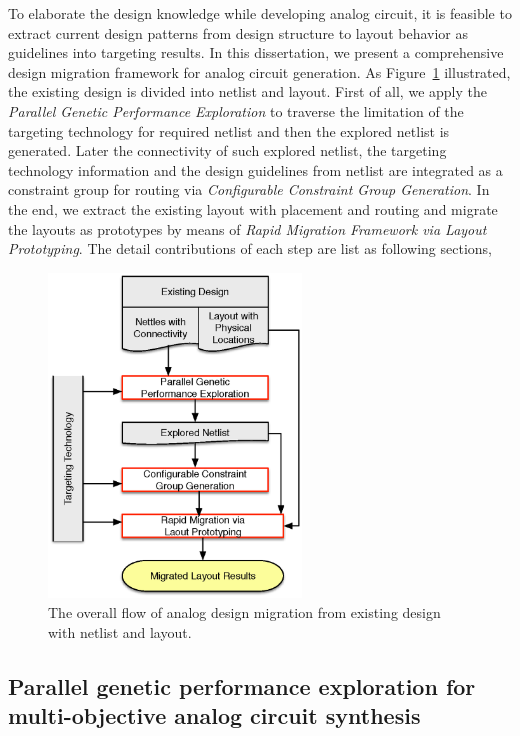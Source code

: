     To elaborate the design knowledge while developing analog circuit, it is feasible to extract current design patterns from design structure to layout behavior as guidelines into targeting results. In this dissertation, we present a comprehensive design migration framework for analog circuit generation. As Figure~\ref{fig:OverallFlow} illustrated, the existing design is divided into netlist and layout. First of all, we apply the {\it Parallel Genetic Performance Exploration} to traverse the limitation of the targeting technology for required netlist and then the explored netlist is generated. Later the connectivity of such explored netlist, the targeting technology information and the design guidelines from netlist are integrated as a constraint group for routing via {\it Configurable Constraint Group Generation}. In the end, we extract the existing layout with placement and routing and migrate the layouts as prototypes by means of {\it Rapid Migration Framework via Layout Prototyping}. The detail contributions of each step are list as following sections,

    \begin{figure}[ht]
        \centerline{
        \includegraphics[width=0.6\textwidth]{Fig/Introduction/OverallFlow.eps}}
        \caption{The overall flow of analog design migration from existing design with netlist and layout.} 
        \label{fig:OverallFlow}
      \end{figure}

    

    \subsection{Parallel genetic performance exploration for multi-objective analog circuit synthesis}\label{subsec:PAGEContribute}

